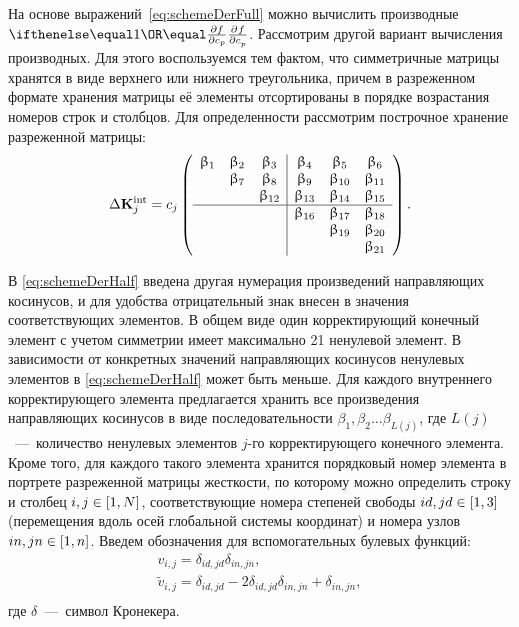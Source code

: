 На основе выражений~\eqref{eq:schemeDerFull} можно вычислить производные $ \partDer{f}{c_p}{} $. Рассмотрим другой вариант вычисления производных. Для этого воспользуемся тем фактом, что симметричные матрицы хранятся в виде верхнего или нижнего треугольника, причем в разреженном формате хранения матрицы её элементы отсортированы в порядке возрастания номеров строк и столбцов. Для определенности рассмотрим построчное хранение разреженной матрицы:
\begin{equation}
	\Delta \mathbf{K} ^ {\text{int}}_j = c_j 
	\left(
	\begin{array}{c c c | c c c}
		\upbeta_1 & \upbeta_2 & \upbeta_3 & \upbeta_4 & \upbeta_5 & \upbeta_6 \\
		& \upbeta_7 & \upbeta_8 & \upbeta_9 & \upbeta_{10} & \upbeta_{11} \\
		& & \upbeta_{12} & \upbeta_{13} & \upbeta_{14} & \upbeta_{15} \\
		\hline
		& & & \upbeta_{16} & \upbeta_{17} & \upbeta_{18} \\
		& & & & \upbeta_{19} & \upbeta_{20}  \\
		& & & & & \upbeta_{21}
	\end{array}
	\right).
	\label{eq:schemeDerHalf}
\end{equation}

В \eqref{eq:schemeDerHalf} введена другая нумерация произведений направляющих косинусов, и для удобства отрицательный знак внесен в значения соответствующих элементов. В общем виде один корректирующий конечный элемент с учетом симметрии имеет максимально 21 ненулевой элемент. В зависимости от конкретных значений направляющих косинусов ненулевых элементов в \eqref{eq:schemeDerHalf} может быть меньше. Для каждого внутреннего корректирующего элемента предлагается хранить все произведения направляющих косинусов в виде последовательности $ \beta_1, \beta_2 \hdots \beta_{L(j)} $, где $ L(j) $~---~количество ненулевых элементов $ j $-го корректирующего конечного элемента. Кроме того, для каждого такого элемента хранится порядковый номер элемента в портрете разреженной матрицы жесткости, по которому можно определить строку и столбец $ i, j \in \left[ 1, N \right] $, соответствующие номера степеней свободы $ id, jd \in \left[ 1, 3 \right] $ (перемещения вдоль осей глобальной системы координат) и номера узлов $ in, jn \in \left[ 1, n \right] $. Введем обозначения для вспомогательных булевых функций:
\begin{equation}
	\begin{gathered}
		v_{i, j} = \delta_{id, jd} \delta_{in, jn}, \\
		\tilde{v}_{i, j} = \delta_{id, jd} - 2 \delta_{id, jd} \delta_{in, jn} + \delta_{in, jn}, \\
	\end{gathered}
\end{equation}
где $ \delta $~---~символ Кронекера.

